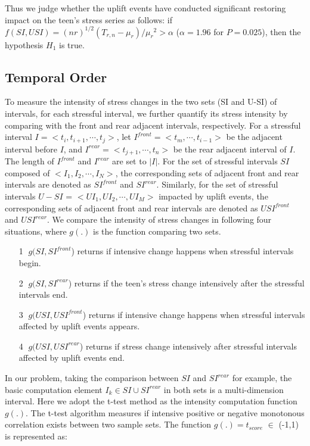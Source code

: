 Thus we judge whether the uplift events have conducted significant restoring impact on the teen's stress series as follows:
if $f(SI,USI)=(nr)^{1/2}(T_{r,n}-\mu_{r})/{\mu_r}^2>\alpha$ ($\alpha = 1.96$ for $P=0.025$),
then the hypothesis $H_1$ is true.

\subsection{Temporal Order}
\label{sec:temporal}
To measure the intensity of stress changes in the two sets (SI and U-SI) of intervals,
for each stressful interval,
we further quantify its stress intensity by comparing with the front and rear adjacent intervals, respectively.
For a stressful interval $I = <t_i,t_{i+1},\cdots,t_j>$,
let $I^{front} = <t_m,\cdots,t_{i-1}>$ be the adjacent interval before $I$,
and $I^{rear} = <t_{j+1},\cdots,t_n>$ be the rear adjacent interval of $I$.
The length of $I^{front}$ and $I^{rear}$ are set to $|I|$.
For the set of stressful intervals $SI$ composed of $<I_1,I_2,\cdots,I_N>$,
the corresponding sets of adjacent front and rear intervals are denoted as $SI^{front}$ and $SI^{rear}$.
Similarly, for the set of stressful intervals $U-SI$ = $<UI_1,UI_2,\cdots, UI_M>$ impacted by uplift events,
the corresponding sets of adjacent front and rear intervals are denoted as $USI^{front}$ and $USI^{rear}$.
We compare the intensity of stress changes in following four situations,
where $g(.)$ is the function comparing two sets.

\begin{itemize}
\item[\textcircled{1}] $g(SI,SI^{front}$) returns if intensive change happens when stressful intervals begin.
\item[\textcircled{2}] $g(SI,SI^{rear}$) returns if the teen's stress change intensively after the stressful intervals end.
\item[\textcircled{3}] $g(USI,USI^{front}$) returns if intensive change happens when stressful intervals affected by uplift events appears.
\item[\textcircled{4}] $g(USI,USI^{rear}$) returns if stress change intensively after stressful intervals affected by uplift events end.
\end{itemize}

In our problem, taking the comparison between $SI$ and $SI^{rear}$ for example,
the basic computation element $I_k \in SI \cup SI^{rear}$ in both sets is a multi-dimension interval.
Here we adopt the t-test method as the intensity computation function $g(.)$.
The t-test algorithm measures if intensive positive or negative monotonous correlation
exists between two sample sets.
The function $g(.) = t_{score}$ $\in$ (-1,1) is represented as:

